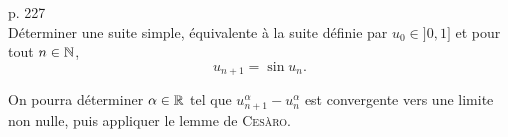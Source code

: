 \begin{exercice}
    \cite{exos_oraux} p. 227\\
    Déterminer une suite simple, équivalente à la suite définie par $u_0 \in ]0, 1]$ et pour tout $n \in \mathbb{N}$,
    $$u_{n+1} = \sin u_n.$$
\end{exercice}

\begin{elem_sol}
    On pourra déterminer $\alpha \in \mathbb{R}$ tel que $u_{n+1}^\alpha - u_n^\alpha$ est convergente vers une limite non nulle, puis appliquer le lemme de \textsc{Cesàro}.
\end{elem_sol}